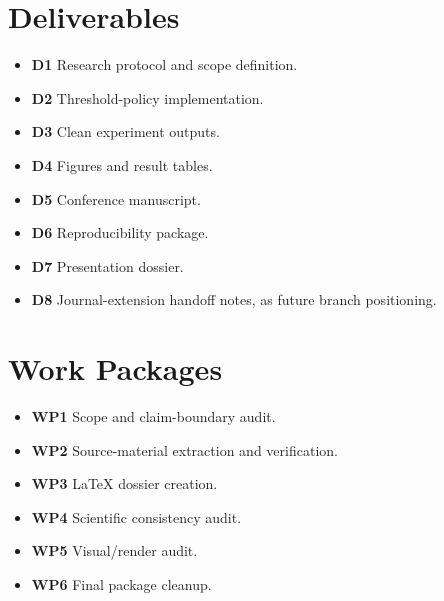 
\begin{minipage}[t]{0.48\linewidth}
\section{Deliverables}
\begin{itemize}[leftmargin=0pt, itemindent=0pt, label={}]
  \item \textbf{D1} Research protocol and scope definition.
  \item \textbf{D2} Threshold-policy implementation.
  \item \textbf{D3} Clean experiment outputs.
  \item \textbf{D4} Figures and result tables.
  \item \textbf{D5} Conference manuscript.
  \item \textbf{D6} Reproducibility package.
  \item \textbf{D7} Presentation dossier.
  \item \textbf{D8} Journal-extension handoff notes, as future branch positioning.
\end{itemize}
\end{minipage}%
\hfill
\begin{minipage}[t]{0.48\linewidth}
\section{Work Packages}
\begin{itemize}[leftmargin=0pt, itemindent=0pt, label={}]
  \item \textbf{WP1} Scope and claim-boundary audit.
  \item \textbf{WP2} Source-material extraction and verification.
  \item \textbf{WP3} LaTeX dossier creation.
  \item \textbf{WP4} Scientific consistency audit.
  \item \textbf{WP5} Visual/render audit.
  \item \textbf{WP6} Final package cleanup.
\end{itemize}
\end{minipage}

\vspace{0.5em}

